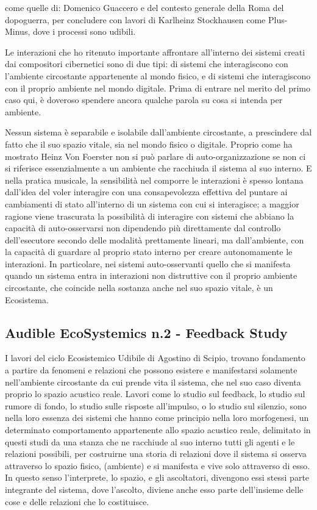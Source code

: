 come quelle di: Domenico Guaccero e 
del contesto generale della Roma del dopoguerra, per concludere con lavori di 
Karlheinz Stockhausen come Plus-Minus, dove i processi sono udibili.

Le interazioni che ho ritenuto importante affrontare 
all'interno dei sistemi creati dai compositori cibernetici sono di due tipi:
di sistemi che interagiscono con l’ambiente circostante appartenente al mondo fisico, 
e di sistemi che interagiscono con il proprio ambiente nel mondo digitale.
Prima di entrare nel merito del primo caso qui,
è doveroso spendere ancora qualche parola su cosa
si intenda per ambiente.

Nessun sistema è separabile e isolabile dall'ambiente circostante, 
a prescindere dal fatto che il suo spazio vitale, sia nel mondo fisico o digitale. 
Proprio come ha mostrato Heinz Von Foerster non si può parlare di auto-organizzazione
se non ci si riferisce essenzialmente a un ambiente che racchiuda il sistema al suo interno.
E nella pratica musicale, la sensibilità nel comporre le interazioni
è spesso lontana dall'idea del voler interagire con una consapevolezza effettiva del 
puntare ai cambiamenti di stato all'interno di un sistema con cui si interagisce;
a maggior ragione viene trascurata la possibilità di interagire con sistemi che abbiano
la capacità di auto-osservarsi non dipendendo più direttamente dal controllo dell'esecutore 
secondo delle modalità prettamente lineari, 
ma dall'ambiente, 
con la capacità di guardare al proprio stato interno per creare autonomamente le interazioni.
In particolare, nei sistemi auto-osservanti quello che si manifesta quando un sistema entra in interazioni non distruttive
con il proprio ambiente circostante, che coincide nella sostanza anche nel suo spazio vitale, è un Ecosistema.

\subsection{Audible EcoSystemics n.2 - Feedback Study}
\label{sec:Audible EcoSystemics n.2 - Feedback Study}

I lavori del ciclo Ecosistemico Udibile di Agostino di Scipio, 
trovano fondamento a partire da fenomeni e relazioni che possono esistere e manifestarsi solamente nell'ambiente 
circostante da cui prende vita il sistema, 
che nel suo caso diventa proprio lo spazio acustico reale. 
Lavori come lo studio sul feedback, lo studio sul rumore di fondo, lo studio sulle risposte all'impulso, o
lo studio sul silenzio, sono nella loro essenza dei sistemi che hanno come principio 
nella loro morfogenesi, un determinato 
comportamento appartenente allo spazio acustico reale, delimitato in questi studi da una stanza
che ne racchiude al suo interno tutti gli agenti e le relazioni possibili,
per costruirne una storia di relazioni dove il sistema si osserva attraverso lo spazio fisico, 
(ambiente) e si manifesta e vive solo attraverso di esso.
In questo senso l’interprete, lo spazio, e gli ascoltatori, 
divengono essi stessi parte integrante del sistema, dove l’ascolto, diviene anche esso
parte dell’insieme delle cose e delle relazioni che lo costituisce. \\

